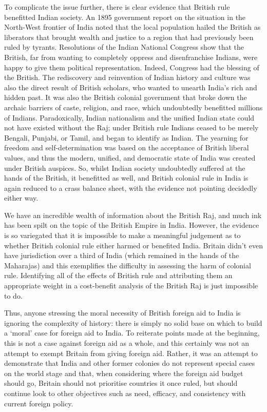    To complicate the issue further, there is clear evidence that British
   rule benefitted Indian society. An 1895 government report on the
   situation in the North-West frontier of India noted that the local
   population hailed the British as liberators that brought wealth and
   justice to a region that had previously been ruled by tyrants.
   Resolutions of the Indian National Congress show that the British, far
   from wanting to completely oppress and disenfranchise Indians, were
   happy to give them political representation. Indeed, Congress had the
   blessing of the British. The rediscovery and reinvention of Indian
   history and culture was also the direct result of British scholars, who
   wanted to unearth India's rich and hidden past. It was also the British
   colonial government that broke down the archaic barriers of caste,
   religion, and race, which undoubtedly benefitted millions of Indians.
   Paradoxically, Indian nationalism and the unified Indian state could
   not have existed without the Raj; under British rule Indians ceased to
   be merely Bengali, Punjabi, or Tamil, and began to identify as Indian.
   The yearning for freedom and self-determination was based on the
   acceptance of British liberal values, and thus the modern, unified, and
   democratic state of India was created under British auspices. So,
   whilst Indian society undoubtedly suffered at the hands of the British,
   it benefitted as well, and British colonial rule in India is again
   reduced to a crass balance sheet, with the evidence not pointing
   decidedly either way.

   We have an incredible wealth of information about the British Raj, and
   much ink has been spilt on the topic of the British Empire in India.
   However, the evidence is so variegated that it is impossible to make a
   meaningful judgement as to whether British colonial rule either harmed
   or benefited India. Britain didn't even have jurisdiction over a third
   of India (which remained in the hands of the Maharajas) and this
   exemplifies the difficulty in assessing the harm of colonial rule.
   Identifying all of the effects of British rule and attributing them an
   appropriate weight in a cost-benefit analysis of the British Raj is
   just impossible to do.

   Thus, anyone stressing the moral necessity of British foreign aid to
   India is ignoring the complexity of history: there is simply no solid
   base on which to build a `moral' case for foreign aid to India. To
   reiterate points made at the beginning, this is not a case against
   foreign aid as a whole, and this certainly was not an attempt to exempt
   Britain from giving foreign aid. Rather, it was an attempt to
   demonstrate that India and other former colonies do not represent
   special cases on the world stage and that, when considering where the
   foreign aid budget should go, Britain should not prioritise countries
   it once ruled, but should continue look to other objectives such as
   need, efficacy, and consistency with current foreign policy.


